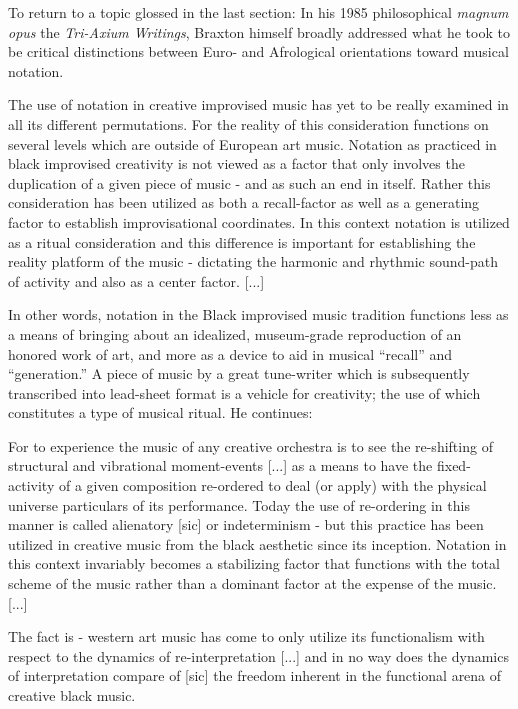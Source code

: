     To return to a topic glossed in the last section: In his 1985 philosophical \textit{magnum opus} the \textit{Tri-Axium Writings}, Braxton himself broadly addressed what he took to be critical distinctions between Euro- and Afrological orientations toward musical notation.
    
    \begin{smallquote}
            The use of notation in creative improvised music has yet to be really examined in all its different permutations. For the reality of this consideration functions on several levels which are outside of European art music. Notation as practiced in black improvised creativity is not viewed as a factor that only involves the duplication of a given piece of music - and as such an end in itself. Rather this consideration has been utilized as both a recall-factor as well as a generating factor to establish improvisational coordinates. In this context notation is utilized as a ritual consideration and this difference is important for establishing the reality platform of the music - dictating the harmonic and rhythmic sound-path of activity and also as a center factor. [...]
    \end{smallquote}

    \noindent In other words, notation in the Black improvised music tradition functions less as a means of bringing about an idealized, museum-grade reproduction of an honored work of art, and more as a device to aid in musical ``recall'' and ``generation.'' A piece of music by a great tune-writer which is subsequently transcribed into lead-sheet format is a vehicle for creativity; the use of which constitutes a type of musical ritual. He continues:

    \begin{smallquote}
            \noindent For to experience the music of any creative orchestra is to see the re-shifting of structural and vibrational moment-events [...] as a means to have the fixed-activity of a given composition re-ordered to deal (or apply) with the physical universe particulars of its performance. Today the use of re-ordering in this manner is called alienatory [sic] or indeterminism - but this practice has been utilized in creative music from the black aesthetic since its inception. Notation in this context invariably becomes a stabilizing factor that functions with the total scheme of the music rather than a dominant factor at the expense of the music. [...]

            \vspace{7pt}
            
            \noindent The fact is - western art music has come to only utilize its functionalism with respect to the dynamics of re-interpretation [...] and in no way does the dynamics of interpretation compare of [sic] the freedom inherent in the functional arena of creative black music.\autocite[35-7]{Braxton_1985}
        \end{smallquote}

